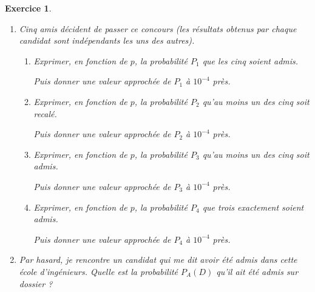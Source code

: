 \documentclass[12pt,a4paper,french]{article}
\theoremstyle{break}
\newtheorem{exercice}{Exercice}
\theoremstyle{nonumberplain}
\theoremstyle{nonumberbreak}
\begin{document}
\begin{exercice}
\begin{enumerate}
\begin{enumerate}
          $P(D) =  \ldots \qquad P_{\overline{D}}(E) = \ldots \qquad
          P_{R}(O) = \ldots $
        \item Déterminer la probabilité $P(E)$ qu'un candidat passe et
          réussisse l'épreuve écrite et la probabilité $P(O)$ qu'un
          candidat passe et réussisse l'épreuve orale.
        \item On note $p$ la probabilité $P(A)$ qu'un candidat soit
          admis dans cette école d'ingénieurs. Justifier que $p$ vaut
          $0,32$.
      \end{enumerate}
    \item Cinq amis décident de passer ce concours (les résultats
      obtenus par chaque candidat sont indépendants les uns des autres).
      \begin{enumerate}
        \item Exprimer, en fonction de $p$, la probabilité $P_{1}$ que
          les cinq soient admis.

          Puis donner une valeur approchée de $P_{1}$ à $10^{-4}$ près.
        \item  Exprimer, en fonction de $p$, la probabilité $P_{2}$
          qu'au moins un des cinq soit recalé.

          Puis donner une valeur approchée de $P_{2}$ à $10^{-4}$ près.
        \item   Exprimer, en fonction de $p$, la probabilité $P_{3}$
          qu'au moins un des cinq soit admis.

          Puis donner une valeur approchée de $P_{3}$ à $10^{-4}$ près.
        \item  Exprimer, en fonction de $p$, la probabilité $P_{4}$ que
          trois exactement soient admis.

          Puis donner une valeur approchée de $P_{4}$ à $10^{-4}$ près.
      \end{enumerate}
    \item Par hasard, je rencontre un candidat qui me dit avoir été
      admis dans cette école d'ingénieurs. Quelle est la probabilité
      $P_{A}(D)$ qu'il ait été admis sur dossier ?
  \end{enumerate}
\end{exercice}

\pagebreak
\end{document}
